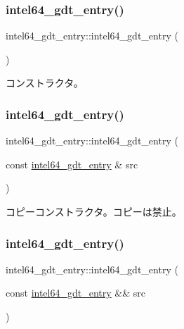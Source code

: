 \subsubsection{\texorpdfstring{intel64\+\_\+gdt\+\_\+entry()}{intel64\_gdt\_entry()}\hspace{0.1cm}{\footnotesize\ttfamily [1/3]}}
{\footnotesize\ttfamily intel64\+\_\+gdt\+\_\+entry\+::intel64\+\_\+gdt\+\_\+entry (\begin{DoxyParamCaption}{ }\end{DoxyParamCaption})}

コンストラクタ。 \hypertarget{classintel64__gdt__entry_add6680b03a055fb4036f7beac8265234}{}\label{classintel64__gdt__entry_add6680b03a055fb4036f7beac8265234} 
\subsubsection{\texorpdfstring{intel64\+\_\+gdt\+\_\+entry()}{intel64\_gdt\_entry()}\hspace{0.1cm}{\footnotesize\ttfamily [2/3]}}
{\footnotesize\ttfamily intel64\+\_\+gdt\+\_\+entry\+::intel64\+\_\+gdt\+\_\+entry (\begin{DoxyParamCaption}\item[{const \hyperlink{classintel64__gdt__entry}{intel64\+\_\+gdt\+\_\+entry} \&}]{src }\end{DoxyParamCaption})\hspace{0.3cm}{\ttfamily [delete]}}

コピーコンストラクタ。コピーは禁止。 \hypertarget{classintel64__gdt__entry_ab4d847662cabdb86c4ac7110e6acc628}{}\label{classintel64__gdt__entry_ab4d847662cabdb86c4ac7110e6acc628} 
\subsubsection{\texorpdfstring{intel64\+\_\+gdt\+\_\+entry()}{intel64\_gdt\_entry()}\hspace{0.1cm}{\footnotesize\ttfamily [3/3]}}
{\footnotesize\ttfamily intel64\+\_\+gdt\+\_\+entry\+::intel64\+\_\+gdt\+\_\+entry (\begin{DoxyParamCaption}\item[{const \hyperlink{classintel64__gdt__entry}{intel64\+\_\+gdt\+\_\+entry} \&\&}]{src }\end{DoxyParamCaption})\hspace{0.3cm}{\ttfamily [delete]}}

